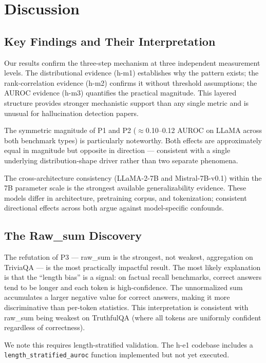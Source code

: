 \section{Discussion}

\subsection{Key Findings and Their Interpretation}

Our results confirm the three-step mechanism at three independent measurement levels. The distributional evidence (h-m1) establishes why the pattern exists; the rank-correlation evidence (h-m2) confirms it without threshold assumptions; the AUROC evidence (h-m3) quantifies the practical magnitude. This layered structure provides stronger mechanistic support than any single metric and is unusual for hallucination detection papers.

The symmetric magnitude of P1 and P2 ($\approx$0.10--0.12 AUROC on LLaMA across both benchmark types) is particularly noteworthy. Both effects are approximately equal in magnitude but opposite in direction --- consistent with a single underlying distribution-shape driver rather than two separate phenomena.

The cross-architecture consistency (LLaMA-2-7B and Mistral-7B-v0.1) within the 7B parameter scale is the strongest available generalizability evidence. These models differ in architecture, pretraining corpus, and tokenization; consistent directional effects across both argue against model-specific confounds.

\subsection{The Raw\_sum Discovery}

The refutation of P3 --- raw\_sum is the strongest, not weakest, aggregation on TriviaQA --- is the most practically impactful result. The most likely explanation is that the ``length bias'' is a signal: on factual recall benchmarks, correct answers tend to be longer and each token is high-confidence. The unnormalized sum accumulates a larger negative value for correct answers, making it more discriminative than per-token statistics. This interpretation is consistent with raw\_sum being weakest on TruthfulQA (where all tokens are uniformly confident regardless of correctness).

We note this requires length-stratified validation. The h-e1 codebase includes a \texttt{length\_stratified\_auroc} function implemented but not yet executed.

